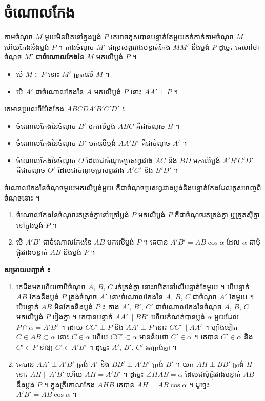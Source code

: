 \section{ចំណោលកែង}
តាមចំណុច $M$ មួយមិនឋិតនៅក្នុងប្លង់ $P$ គេអាចគូសបានបន្ទាត់តែមួយគត់កាត់តាមចំណុច $M$ ហើយកែងនឹងប្លង់ $P$ ។ តាងចំណុច $M'$ ជាប្រសព្វរវាងបន្ទាត់កែង $MM'$ នឹងប្លង់ $P$ ដូច្នេះ គេហៅថាចំណុច $M'$ ជា\textbf{ចំណោលកែង}នៃ $M$ មកលើប្លង់ $P$ ។
\begin{note}[សម្គាល់]
\begin{itemize}
  \item បើ $M \in P$ នោះ $M'$ ត្រួតលើ $M$ ។
  \item បើ $A'$ ជាចំណោលកែងនៃ $A$ មកលើប្លង់ $P$ នោះ $AA' \perp P$ ។
\end{itemize}
\end{note}
គេមានប្រលេពីប៉ែតកែង $ABCDA'B'C'D'$ ៖
\begin{itemize}
  \item ចំណោលកែងនៃចំណុច $B'$ មកលើប្លង់ $ABC$ គឺជាចំណុច $B$ ។
  \item ចំណោលកែងនៃចំណុច $D'$ មកលើប្លង់ $AA'B'$ គឺជាចំណុច $A'$ ។
  \item ចំណោលកែងនៃចំណុច $O$ ដែលជាចំណុចប្រសព្វរវាង $AC$ និង $BD$ មកលើប្លង់ $A'B'C'D'$ គឺជាចំណុច $O'$ ដែលជាចំណុចប្រសព្វរវាង $A'C'$ និង $B'D'$ ។
\end{itemize}
\begin{definition}[និយមន័យ]
ចំណោលកែងនៃចំណុចមួយមកលើប្លង់មួយ គឺជាចំណុចប្រសព្វរវាងប្លង់និងបន្ទាត់កែងដែលគូសចេញពីចំណុចនោះ ។
\end{definition}
\begin{theorem}[លក្ខណៈ]
\begin{enumerate}[a]
  \item ចំណោលកែងនៃចំណុចរត់ត្រង់គ្នានៅក្រៅប្លង់ $P$ មកលើប្លង់ $P$ គឺជាចំណុចរត់ត្រង់គ្នា ឬត្រួតស៊ីគ្នានៅក្នុងប្លង់ $P$ ។
  \item បើ $A'B'$ ជាចំណោលកែងនៃ $AB$ មកលើប្លង់ $P$ ។ គេបាន $A'B' = AB\cos\alpha$ ដែល $\alpha$ ជាមុំផ្គុំរវាងបន្ទាត់ $AB$ និងប្លង់ $P$ ។
\end{enumerate}
\end{theorem}
\textbf{សម្រាយបញ្ជាក់ ៖}
\begin{enumerate}[a]
  \item គេដឹងមកហើយថាបីចំណុច $A$, $B$, $C$ រត់ត្រង់គ្នា នោះវាឋិតនៅលើបន្ទាត់តែមួយ ។ បើបន្ទាត់ $AB$ កែងនឹងប្លង់ $P$ ត្រង់ចំណុច $A'$ នោះចំណោលកែងនៃ $A$, $B$, $C$ ជាចំណុច $A'$ តែមួយ ។ បើបន្ទាត់ $AB$ មិនកែងនឹងប្លង់ $P$ ៖ តាង $A'$, $B'$, $C'$ ជាចំណោលកែងនៃចំណុច $A$, $B$, $C$ មកលើប្លង់ $P$ រៀងគ្នា ។ គេបានបន្ទាត់ $AA' \parallel BB'$ ហើយកំណត់បានប្លង់ $\alpha$ មួយដែល $P \cap \alpha = A'B'$ ។ ដោយ $CC' \perp P$ និង $AA' \perp P$ នោះ $CC' \parallel AA'$ ។ ម្យ៉ាងទៀត $C \in AB \subset \alpha$ នោះ $C \in \alpha$ ហើយ $CC' \subset \alpha$ មានន័យថា $C' \in \alpha$ ។ គេបាន $C' \in \alpha$ និង $C' \in P$ នាំឱ្យ $C' \in A'B'$ ។ ដូច្នេះ $A'$, $B'$, $C'$ រត់ត្រង់គ្នា ។
  \item គេបាន $AA' \perp A'B'$ ត្រង់ $A'$ និង $BB' \perp A'B'$ ត្រង់ $B'$ ។ យក $AH \perp BB'$ ត្រង់ $H$ នោះ $AH \parallel A'B'$ ហើយ $AH = A'B'$ ។ ដូច្នេះ $\angle HAB = \alpha$ ដែលជាមុំផ្គុំរវាងបន្ទាត់ $AB$ នឹងប្លង់ $P$ ។ ក្នុងត្រីកោណកែង $AHB$ គេបាន $AH = AB\cos\alpha$ ។ ដូច្នេះ $A'B' = AB\cos\alpha$ ។
\end{enumerate}

